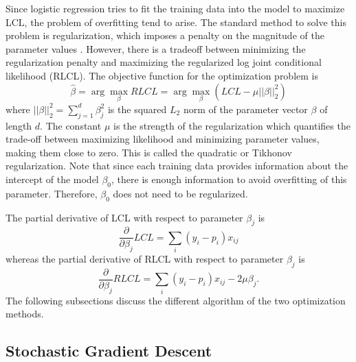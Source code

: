 \documentclass{article} %
\newcommand{\argmax}{\arg\!\max}
\begin{document}
Since logistic regression tries to fit the training data into the model to maximize LCL, the problem of overfitting tend to arise. The  standard method to solve this problem is regularization, which imposes a penalty on the magnitude of the parameter values \cite{elkan}. However, there is a tradeoff between minimizing the regularization penalty and maximizing the regularized log joint conditional likelihood (RLCL). The objective function for the optimization problem is
\begin{equation} \label{eq:objfun_reg}
\hat{\beta} = \argmax_{\beta} RLCL = \argmax_{\beta} (LCL - \mu ||\beta||_2^2)
\end{equation}
where $||\beta||_2^2 = \sum_{j=1}^{d} \beta_j^2$ is the squared $L_2$ norm of the parameter vector $\beta$ of length $d$. The constant $\mu$ is the strength of the regularization which quantifies the trade-off between maximizing likelihood and minimizing parameter values, making them close to zero. This is called the quadratic or Tikhonov regularization. Note that since each training data provides information about the intercept of the model $\beta_0$, there is enough information to avoid overfitting of this parameter. Therefore, $\beta_0$ does not need to be regularized.

The partial derivative of LCL with respect to parameter $\beta_j$ is
\begin{equation} \label{eq:d_LCL}
\frac{\partial}{\partial \beta_j} LCL = \sum_i(y_i-p_i)x_{ij}
\end{equation}
whereas the partial derivative of RLCL with respect to parameter $\beta_j$ is
\begin{equation} \label{eq:d_RLCL}
\frac{\partial}{\partial \beta_j} RLCL = \sum_i(y_i-p_i)x_{ij} - 2 \mu \beta_j.
\end{equation}
The following subsections discuss the different algorithm of the two optimization methods.


\subsection{Stochastic Gradient Descent}
\end{document}
